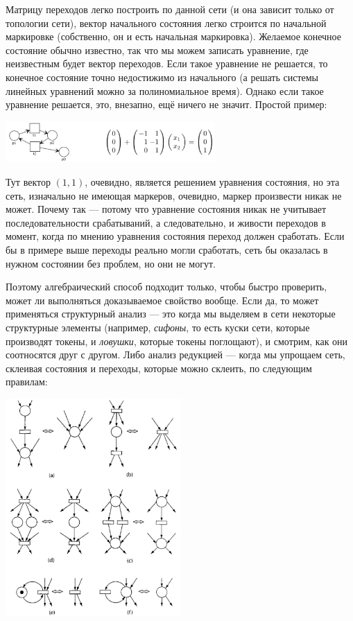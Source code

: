 \documentclass{../mcstext}
\begin{document}
Матрицу переходов легко построить по данной сети (и она зависит только от топологии сети), вектор начального состояния легко строится по начальной маркировке (собственно, он и есть начальная маркировка). Желаемое конечное состояние обычно известно, так что мы можем записать уравнение, где неизвестным будет вектор переходов. Если такое уравнение не решается, то конечное состояние точно недостижимо из начального (а решать системы линейных уравнений можно за полиномиальное время). Однако если такое уравнение решается, это, внезапно, ещё ничего не значит. Простой пример:

\begin{center}
    \includegraphics[width=0.6\textwidth]{algebraicAnalysisFail.png}
\end{center}

Тут вектор $(1, 1)$, очевидно, является решением уравнения состояния, но эта сеть, изначально не имеющая маркеров, очевидно, маркер произвести никак не может. Почему так --- потому что уравнение состояния никак не учитывает последовательности срабатываний, а следовательно, и живости переходов в момент, когда по мнению уравнения состояния переход должен сработать. Если бы в примере выше переходы реально могли сработать, сеть бы оказалась в нужном состоянии без проблем, но они не могут.

Поэтому алгебраический способ подходит только, чтобы быстро проверить, может ли выполняться доказываемое свойство вообще. Если да, то может применяться структурный анализ --- это когда мы выделяем в сети некоторые структурные элементы (например, \textit{сифоны}, то есть куски сети, которые производят токены, и \textit{ловушки}, которые токены поглощают), и смотрим, как они соотносятся друг с другом. Либо анализ редукцией --- когда мы упрощаем сеть, склеивая состояния и переходы, которые можно склеить, по следующим правилам:

\begin{center}
    \includegraphics[width=0.5\textwidth]{petriReduction.png}
\end{center}
\end{document}
